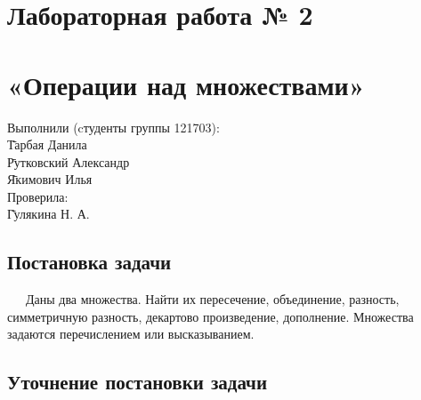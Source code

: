 \documentclass[a4paper,12pt]{extarticle}
\begin{document}

\hspace{0pt}
\vfill
\begin{center}
\section*{Лабораторная работа № 2}
\section*{«Операции над множествами»}
\end{center}
\vfill
\begin{tabbing}
Выполнили (cтуденты группы 121703):\\
\hspace{1em} \= Тарбая Данила\\
\hspace{1em} \= Рутковский Александр\\
\hspace{1em} \= Якимович Илья\\
Проверила:\\
\hspace{1em} \= Гулякина Н. А.\\
\end{tabbing}
\hspace{0pt}
\pagebreak


\newpage
\fancyhf{}
\begin{center}
\section*{Постановка задачи}
\end{center}
\justify\ \ \ Даны два множества. Найти их пересечение, объединение, разность, симметричную разность, декартово произведение, дополнение. Множества задаются перечислением или высказыванием.
\begin{center}
\section*{Уточнение постановки задачи}
\end{center}
\end{document}
